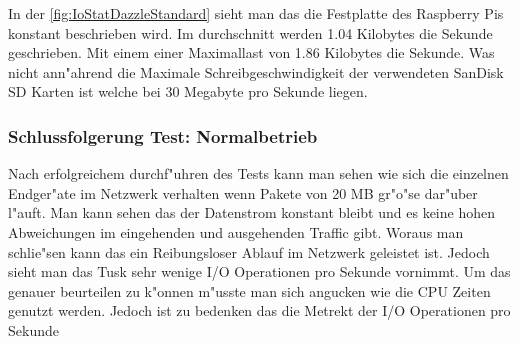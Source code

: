 In der \cref{fig:IoStatDazzleStandard} sieht man das die Festplatte des Raspberry Pis konstant beschrieben wird. Im durchschnitt werden 1.04 Kilobytes %
die Sekunde geschrieben. Mit einem einer Maximallast von 1.86 Kilobytes die Sekunde. Was nicht ann"ahrend die Maximale Schreibgeschwindigkeit der verwendeten %
SanDisk SD Karten ist welche bei 30 Megabyte\autocite{san:sd} pro Sekunde liegen. 

\subsubsection{Schlussfolgerung Test: Normalbetrieb}
\label{subsubsec:schlussfolgerung:normalbetrieb}
Nach erfolgreichem durchf"uhren des Tests kann man sehen wie sich die einzelnen Endger"ate im Netzwerk verhalten wenn Pakete von 20 MB gr"o"se dar"uber l"auft. %
Man kann sehen das der Datenstrom konstant bleibt und es keine hohen Abweichungen im eingehenden und ausgehenden Traffic gibt. Woraus man schlie"sen kann das %
ein Reibungsloser Ablauf im Netzwerk geleistet ist. Jedoch sieht man das Tusk sehr wenige I/O Operationen pro Sekunde vornimmt. Um das genauer beurteilen zu k"onnen %
m"usste man sich angucken wie die CPU Zeiten genutzt werden. Jedoch ist zu bedenken das die Metrekt der I/O Operationen pro Sekunde  




